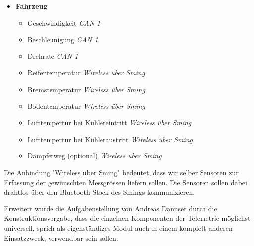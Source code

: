 \begin{itemize}
	\item \textbf{Fahrzeug}		
	\begin{itemize}
		\itemsep 1pt \parskip 0pt \parsep 0pt
		\item Geschwindigkeit						\textit{CAN 1}
		\item Beschleunigung						\textit{CAN 1}
		\item Drehrate 								\textit{CAN 1}
		\item Reifentemperatur						\textit{Wireless über Sming}
		\item Bremstemperatur						\textit{Wireless über Sming}
		\item Bodentemperatur						\textit{Wireless über Sming}
		\item Lufttempertur bei Kühlereintritt		\textit{Wireless über Sming}
		\item Lufttempertur bei Kühleraustritt		\textit{Wireless über Sming}
		\item Dämpferweg (optional)					\textit{Wireless über Sming}
		
	\end{itemize}			
\end{itemize}

Die Anbindung "Wireless über Sming" bedeutet, dass wir selber Sensoren zur Erfassung der gewünschten Messgrössen liefern sollen. Die Sensoren sollen dabei drahtlos über den Bluetooth-Stack des Smings kommunizieren.

Erweitert wurde die Aufgabenstellung von Andreas Danuser durch die Konstruktionsvorgabe, dass die einzelnen Komponenten der Telemetrie möglichst universell, sprich als eigenständiges Modul auch in einem komplett anderen Einsatzzweck, verwendbar sein sollen.

